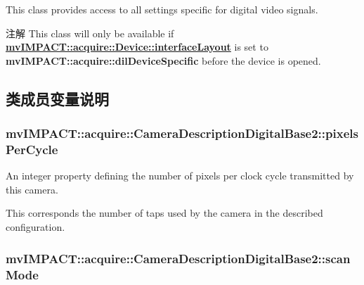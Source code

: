 This class provides access to all settings specific for digital video signals.

\begin{DoxyNote}{注解}
This class will only be available if {\bfseries \hyperlink{classmv_i_m_p_a_c_t_1_1acquire_1_1_device_ab4dd0ecc9d456bb5ddc01d844c9d6f2d}{mv\+I\+M\+P\+A\+C\+T\+::acquire\+::\+Device\+::interface\+Layout}} is set to {\bfseries mv\+I\+M\+P\+A\+C\+T\+::acquire\+::dil\+Device\+Specific} before the device is opened. 
\end{DoxyNote}


\subsection{类成员变量说明}
\hypertarget{classmv_i_m_p_a_c_t_1_1acquire_1_1_camera_description_digital_base2_aeb16b4df160c9f47b833e4264ff09602}{
\subsubsection[{pixels\+Per\+Cycle}]{ mv\+I\+M\+P\+A\+C\+T\+::acquire\+::\+Camera\+Description\+Digital\+Base2\+::pixels\+Per\+Cycle}}\label{classmv_i_m_p_a_c_t_1_1acquire_1_1_camera_description_digital_base2_aeb16b4df160c9f47b833e4264ff09602}


An integer property defining the number of pixels per clock cycle transmitted by this camera. 

This corresponds the number of taps used by the camera in the described configuration. \hypertarget{classmv_i_m_p_a_c_t_1_1acquire_1_1_camera_description_digital_base2_a4b1e7be4e83a56bfaf23a298f47029de}{
\subsubsection[{scan\+Mode}]{ mv\+I\+M\+P\+A\+C\+T\+::acquire\+::\+Camera\+Description\+Digital\+Base2\+::scan\+Mode}}\label{classmv_i_m_p_a_c_t_1_1acquire_1_1_camera_description_digital_base2_a4b1e7be4e83a56bfaf23a298f47029de}


